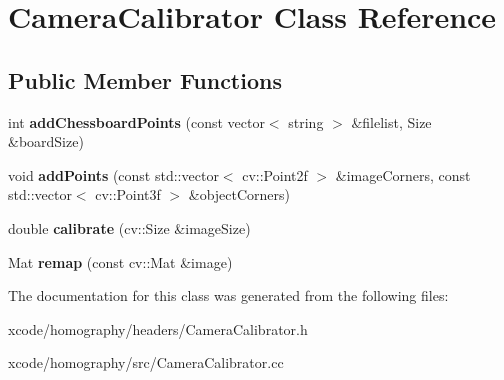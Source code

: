 \hypertarget{class_camera_calibrator}{\section{Camera\-Calibrator Class Reference}
\label{class_camera_calibrator}
}
\subsection*{Public Member Functions}
\begin{DoxyCompactItemize}
\item 
\hypertarget{class_camera_calibrator_a525d73f2da64eb204f7b18869366d3fb}{int {\bfseries add\-Chessboard\-Points} (const vector$<$ string $>$ \&filelist, Size \&board\-Size)}\label{class_camera_calibrator_a525d73f2da64eb204f7b18869366d3fb}

\item 
\hypertarget{class_camera_calibrator_afd58e42b53941ef5e1dade637f90f5b4}{void {\bfseries add\-Points} (const std\-::vector$<$ cv\-::\-Point2f $>$ \&image\-Corners, const std\-::vector$<$ cv\-::\-Point3f $>$ \&object\-Corners)}\label{class_camera_calibrator_afd58e42b53941ef5e1dade637f90f5b4}

\item 
\hypertarget{class_camera_calibrator_acf70d5b8a2e8eb17822e864ad936ae3f}{double {\bfseries calibrate} (cv\-::\-Size \&image\-Size)}\label{class_camera_calibrator_acf70d5b8a2e8eb17822e864ad936ae3f}

\item 
\hypertarget{class_camera_calibrator_af1b2cff3d345a70bbc5421c20847b14f}{Mat {\bfseries remap} (const cv\-::\-Mat \&image)}\label{class_camera_calibrator_af1b2cff3d345a70bbc5421c20847b14f}

\end{DoxyCompactItemize}


The documentation for this class was generated from the following files\-:\begin{DoxyCompactItemize}
\item 
xcode/homography/headers/Camera\-Calibrator.\-h\item 
xcode/homography/src/Camera\-Calibrator.\-cc\end{DoxyCompactItemize}
